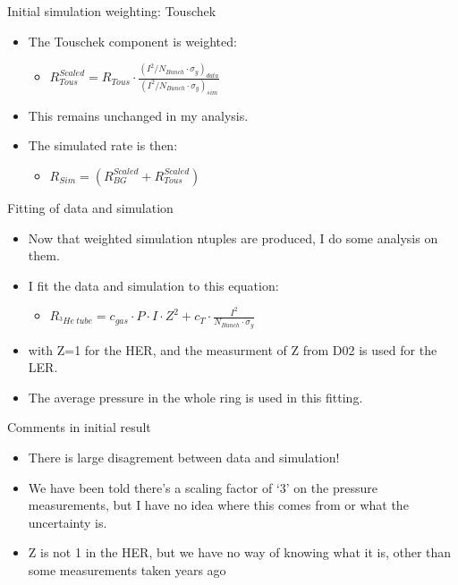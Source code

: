 \documentclass[xcolor=dvipsnames]{beamer}
\begin{document}
\begin{frame}{Initial simulation weighting: Touschek}
\begin{itemize}
	\item
	The Touschek component is weighted:
	\begin{itemize}
		\item
		$R_{Tous}^{Scaled} = R_{Tous}\cdot\frac{(I^{2}/N_{Bunch}\cdot\sigma_{y})_{data} }{(I^{2}/N_{Bunch}\cdot\sigma_{y})_{sim}}$	
	\end{itemize}
	\item
	This remains unchanged in my analysis.
	\item
	The simulated rate is then:
	\begin{itemize}
		\item
		$R_{Sim} = \left(R_{BG}^{Scaled}+R_{Tous}^{Scaled}\right)$
	\end{itemize}
		
\end{itemize}
\end{frame}


\begin{frame}{Fitting of data and simulation}
\begin{itemize}
	\item
	Now that weighted simulation ntuples are produced, I do some analysis on them.
	\item
	I fit the data and simulation to this equation:
	\begin{itemize}
		\item
		$R_{^{3}He\ tube} = c_{gas}\cdot P\cdot I\cdot Z^{2}+c_{T}\cdot \frac{I^{2}}{N_{Bunch}\cdot\sigma_{y}}$
	\end{itemize}
	\item
	with Z=1 for the HER, and the measurment of Z from D02 is used for the LER.
	\item
	The average pressure in the whole ring is used in this fitting.

\end{itemize}
\end{frame}


\begin{frame}{Comments in initial result}
\begin{itemize}
	\item
	There is large disagrement between data and simulation!
	\item
	We have been told there's a scaling factor of `3' on the pressure measurements, but I have no idea where this comes from or what the uncertainty is.
	\item
	Z is not 1 in the HER, but we have no way of knowing what it is, other than some measurements taken years ago

\end{itemize}
\end{frame}
\end{document}
